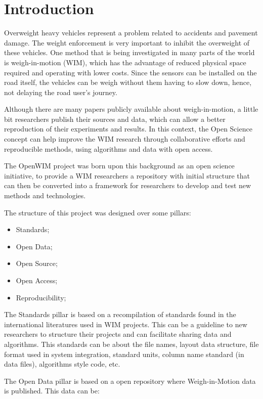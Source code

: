 \documentclass[a4paper]{article}
\begin{document}
\section{Introduction}
{

Overweight heavy vehicles represent a problem related to accidents and pavement damage. The weight enforcement is very important to inhibit the overweight of these vehicles. One method that is being investigated in many parts of the world is weigh-in-motion (WIM), which has the advantage of reduced physical space required and operating with lower costs. Since the sensors can be installed on the road itself, the vehicles can be weigh without them having to slow down, hence, not delaying the road user’s journey.

Although there are many papers publicly available about weigh-in-motion, a little bit researchers publish their sources and data, which can allow a better reproduction of their experiments and results. In this context, the Open Science concept can help improve the WIM research through collaborative efforts and reproducible methods, using algorithms and data with open access.

The OpenWIM project was born upon this background as an open science initiative, to provide a WIM researchers a repository with initial structure that can then be converted into a framework for researchers to develop and test new methods and technologies.

The structure of this project was designed over some pillars:
\begin{itemize}
\item Standards;
\item Open Data;
\item Open Source;
\item Open Access;
\item Reproducibility;
\end{itemize}

The Standards pillar is based on a recompilation of standards found in the international literatures used in WIM projects. This can be a guideline to new researchers to structure their projects and can facilitate sharing data and algorithms. This standards can be about the file names, layout data structure, file format used in system integration, standard units, column name standard (in data files), algorithms style code, etc.

The Open Data pillar is based on a open repository where Weigh-in-Motion data is published. This data can be:

}
\end{document}
